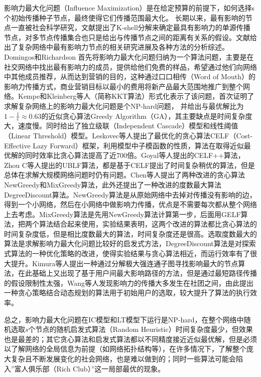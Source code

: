 影响力最大化问题（Influence Maximization）是在给定预算的前提下，如何选择s个初始传播种子节点，最终使得它们传播范围最大化。
长期以来，最有影响的节点\cite{qing2013new,zhuo2013analysis,aral2012identifying}一直被社会科学研究，文献\cite{kitsak2010identification}提出了K-shell分解来确定最具有影响力的单源传播节点，对多节点传播集合也只是给出与传播节点之间的距离有关系的假设。文献\cite{renxiaolong2014,liujg2013}给出了复杂网络中最有影响力节点的相关研究进展及各种方法的分析综述。Domingos\cite{domingos2001mining}和Richardson\cite{richardson2002mining} 首先将影响力最大化问题归纳为一个算法问题，主要是在社交网络中找出最有影响力的成员，提供给他们免费的样品，希望通过他们向网络中其他成员推荐，从而达到营销的目的，这种通过口口相传（Word of Mouth）的影响力传播方式，商业营销目标以最小的费用将新产品最大范围地推广到整个网络。Kempe和Kleinberg等人（简称KKT算法）\cite{kempe2003maximizing}形式化表示了该问题，首次证明了求解复杂网络上的影响力最大化问题是个NP-hard问题，
并给出与最优解比为$1-\frac{1}{e} \approx 0.63$的近似贪心算法Greedy Algorithm（GA），其主要缺点是时间复杂度大，速度慢。同时给出了独立级联（Independent Cascade）模型和线性阈值（Linear Threshold）模型。Leskovec\cite{leskovec2007cost}等人提出了最优化的贪心算法CELF（Cost-Effective Lazy Forward）框架，利用模型中子模函数的性质，算法在取得近似最优解的同时效率比贪心算法提高了近700倍。Goyal\cite{goyal2011celf++}等人提出的CELF++算法，Zhou C等人\cite{zhou2013ublf}提出的UBLF算法，都是基于CELF提出了时间复杂稍优的算法，但是总体在求解大规模网络问题时仍有问题。Chen等人\cite{chen2009efficient}提出了两种改进的贪心算法NewGreedy和MixGreedy算法，此外还提出了一种改进的度数最大算法DegreeDiscount算法。NewGreedy算法是从原始网络中去掉对传播没有影响的边，得到一个小网络，然后在小网络中做影响力传播，优点是不需要每次都从整个网络上去考虑。MixGreedy算法是先用NewGreedy算法计算第一步，后面用GELF算法，把两个算法结合起来使用，实验结果表明，这两个改进的算法都比贪心算法的时间复杂度低，但是相比度数最大的算法，时间复杂度还是很高。选取度数最大的算法是求解影响力最大化问题比较好的启发式方法，DegreeDiscount算法\cite{chen2009efficient}是对探索式算法的一种优化策略的改进，使得实验结果与贪心算法相近，而运行效率有了很大提升。Kimura等人\cite{kimura2006tractable}提出一种通过分解极大强连通子图寻找影响最大的节点算法，在此基础上又出现了基于用户间最大影响路径的方法\cite{chen2010scalableIM}，但是通过最短路径传播的假设限制性太强，Wang等人\cite{wang2010community}发现影响力的传播大多发生在社团之间，由此提出一种贪心策略结合动态规划的算法用于初始用户的选取，较大提升了算法的执行效率。

总之，影响力最大化问题在IC模型和LT模型下运行是NP-hard\cite{kempe2003maximizing}，在整个网络中随机选取$s$个节点的随机启发式算法（Random Heuristic）时间复杂度最少，但效果也是最差的；其它贪心算法和启发式算法都以不同精度接近近似最优解，但是必须以了解网络的全局信息为前提（如网络拓扑结构等），在许多情况下，了解整个庞大复杂且不断发展变化的社会网络，也是难以做到的；同时一些算法可能会陷入”富人俱乐部（Rich Club）”\cite{zhou2004rich}这一局部最优的现象。

